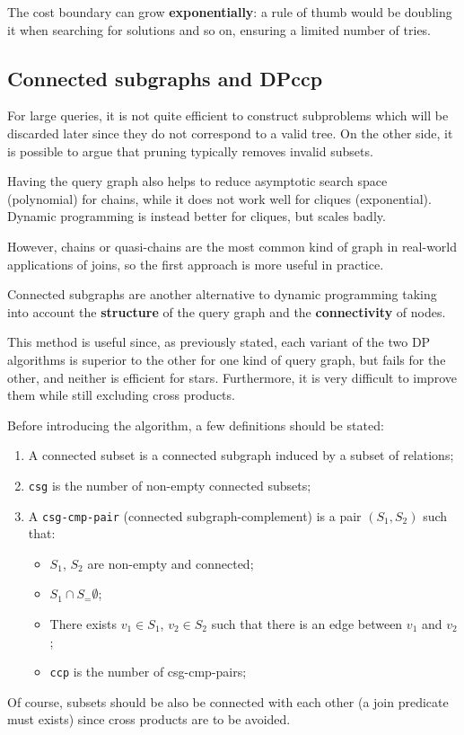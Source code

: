 The cost boundary can grow \textbf{exponentially}: a rule of thumb would be doubling it when searching for solutions and so on, ensuring a limited number of tries. 

\subsection{Connected subgraphs and DPccp}
For large queries, it is not quite efficient to construct subproblems which will be discarded later since they do not correspond to a valid tree. On the other side, it is possible to argue that pruning typically removes invalid subsets.

Having the query graph also helps to reduce asymptotic search space (polynomial) for chains, while it does not work well for cliques (exponential). Dynamic programming is instead better for cliques, but scales badly.

However, chains or quasi-chains are the most common kind of graph in real-world applications of joins, so the first approach is more useful in practice.

Connected subgraphs are another alternative to dynamic programming taking into account the \textbf{structure} of the query graph and the \textbf{connectivity} of nodes. 

This method is useful since, as previously stated, each variant of the two DP algorithms is superior to the other for one kind of query graph, but fails for the other, and neither is efficient for stars. Furthermore, it is very difficult to improve them while still excluding cross products.

Before introducing the algorithm, a few definitions should be stated:
\begin{enumerate}
	\item A connected subset is a connected subgraph induced by a subset of relations;
	\item \texttt{csg} is the number of non-empty connected subsets;
	\item A \texttt{csg-cmp-pair} (connected subgraph-complement) is a pair $(S_1, S_2)$ such that:
	\begin{itemize}
		\item $S_1$, $S_2$ are non-empty and connected;
		\item $S_1 \cap S_= \emptyset$;
		\item There exists $v_1 \in S_1$, $v_2 \in S_2$ such that there is an edge between $v_1$ and $v_2$;
		\item \texttt{ccp} is the number of csg-cmp-pairs;
	\end{itemize} 
\end{enumerate}
Of course, subsets should be also be connected with each other (a join predicate must exists) since cross products are to be avoided.


